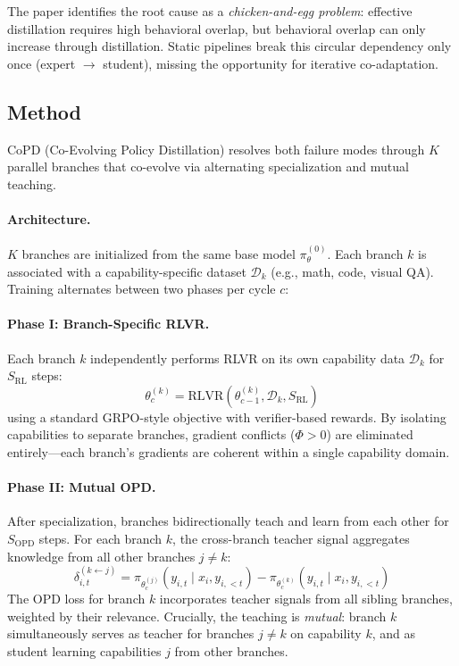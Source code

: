 \documentclass[11pt]{article}
\begin{document}
The paper identifies the root cause as a \emph{chicken-and-egg problem}: effective distillation requires high behavioral overlap, but behavioral overlap can only increase through distillation. Static pipelines break this circular dependency only once (expert $\to$ student), missing the opportunity for iterative co-adaptation.

\subsection{Method}

CoPD (Co-Evolving Policy Distillation) resolves both failure modes through $K$ parallel branches that co-evolve via alternating specialization and mutual teaching.

\paragraph{Architecture.}
$K$ branches are initialized from the same base model $\pi_\theta^{(0)}$. Each branch $k$ is associated with a capability-specific dataset $\mathcal{D}_k$ (e.g., math, code, visual QA). Training alternates between two phases per cycle $c$:

\paragraph{Phase I: Branch-Specific RLVR.}
Each branch $k$ independently performs RLVR on its own capability data $\mathcal{D}_k$ for $S_{\mathrm{RL}}$ steps:
\begin{equation}
    \theta_c^{(k)} = \mathrm{RLVR}(\theta_{c-1}^{(k)}, \mathcal{D}_k, S_{\mathrm{RL}})
\end{equation}
using a standard GRPO-style objective with verifier-based rewards. By isolating capabilities to separate branches, gradient conflicts ($\Phi > 0$) are eliminated entirely---each branch's gradients are coherent within a single capability domain.

\paragraph{Phase II: Mutual OPD.}
After specialization, branches bidirectionally teach and learn from each other for $S_{\mathrm{OPD}}$ steps. For each branch $k$, the cross-branch teacher signal aggregates knowledge from all other branches $j \neq k$:
\begin{equation}
    \delta_{i,t}^{(k \leftarrow j)} = \pi_{\theta_c^{(j)}}(y_{i,t} \mid x_i, y_{i,<t}) - \pi_{\theta_c^{(k)}}(y_{i,t} \mid x_i, y_{i,<t})
\end{equation}
The OPD loss for branch $k$ incorporates teacher signals from all sibling branches, weighted by their relevance. Crucially, the teaching is \emph{mutual}: branch $k$ simultaneously serves as teacher for branches $j \neq k$ on capability $k$, and as student learning capabilities $j$ from other branches.
\end{document}

